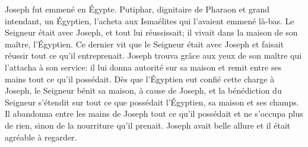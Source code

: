 Joseph fut emmené en Égypte.
Putiphar, dignitaire de Pharaon et grand intendant, un Égyptien,
	l’acheta aux Ismaélites qui l’avaient emmené là-bas.
Le Seigneur était avec Joseph, et tout lui réussissait;
	il vivait dans la maison de son maître, l’Égyptien.
Ce dernier vit que le Seigneur était avec Joseph
	et faisait réussir tout ce qu’il entreprenait.
Joseph trouva grâce aux yeux de son maître qui l’attacha à son service:
	il lui donna autorité sur sa maison et remit entre ses mains tout ce qu’il possédait.
Dès que l’Égyptien eut confié cette charge à Joseph,
	le Seigneur bénit sa maison, à cause de Joseph,
	et la bénédiction du Seigneur s’étendit sur tout ce que possédait l’Égyptien,
		sa maison et ses champs.
Il abandonna entre les mains de Joseph tout ce qu’il possédait
	et ne s’occupa plus de rien, sinon de la nourriture qu’il prenait.
Joseph avait belle allure et il était agréable à regarder.
